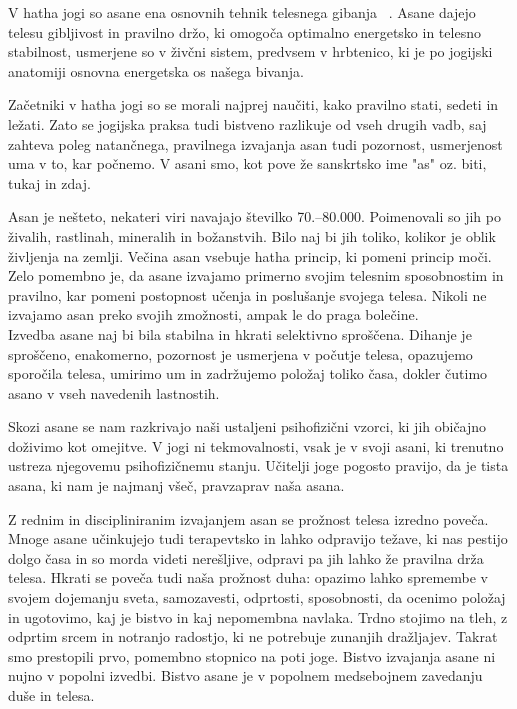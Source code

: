 \documentclass[a4paper, 12pt]{book}
\begin{document}
V hatha jogi so asane ena osnovnih tehnik telesnega gibanja  ~\cite{Asane}. Asane dajejo telesu gibljivost in pravilno držo, ki omogoča optimalno energetsko in telesno stabilnost, usmerjene so v živčni sistem, predvsem v hrbtenico, ki je po jogijski anatomiji osnovna energetska os našega bivanja.

Začetniki v hatha jogi so se morali najprej naučiti, kako pravilno stati, sedeti in ležati. Zato se jogijska praksa tudi bistveno razlikuje od vseh drugih vadb, saj zahteva poleg natančnega, pravilnega izvajanja asan tudi pozornost, usmerjenost uma v to, kar počnemo. V asani smo, kot pove že sanskrtsko ime "as" oz. biti, tukaj in zdaj.

Asan je nešteto, nekateri viri navajajo številko 70.–80.000. Poimenovali so jih po živalih, rastlinah, mineralih in  božanstvih. Bilo naj bi jih toliko, kolikor je oblik življenja na zemlji. Večina asan vsebuje hatha princip, ki pomeni princip moči. Zelo pomembno je, da asane izvajamo primerno svojim telesnim sposobnostim in pravilno, kar pomeni postopnost učenja in poslušanje svojega telesa. Nikoli ne izvajamo asan preko svojih zmožnosti, ampak le do praga bolečine. \\ 

Izvedba asane naj bi bila stabilna in hkrati selektivno sproščena. Dihanje je sproščeno, enakomerno, pozornost je usmerjena v počutje telesa, opazujemo sporočila telesa, umirimo um in zadržujemo položaj toliko časa, dokler čutimo asano v vseh navedenih lastnostih. 

Skozi asane se nam razkrivajo naši ustaljeni psihofizični vzorci, ki jih običajno doživimo kot omejitve. V jogi ni tekmovalnosti, vsak je v svoji asani, ki trenutno ustreza njegovemu psihofizičnemu stanju. Učitelji joge pogosto pravijo, da je tista asana, ki nam je najmanj všeč, pravzaprav naša asana.

Z rednim in discipliniranim izvajanjem asan se prožnost telesa izredno poveča. Mnoge asane učinkujejo tudi terapevtsko in lahko odpravijo težave, ki nas pestijo dolgo časa in so morda videti nerešljive, odpravi pa jih lahko že pravilna drža telesa. Hkrati se poveča tudi naša prožnost duha: opazimo lahko spremembe v svojem dojemanju sveta, samozavesti, odprtosti, sposobnosti, da ocenimo položaj in ugotovimo, kaj je bistvo in kaj nepomembna navlaka. Trdno stojimo na tleh, z odprtim srcem in notranjo radostjo, ki ne potrebuje zunanjih dražljajev. Takrat smo prestopili prvo, pomembno stopnico na poti joge.
Bistvo izvajanja asane ni nujno v popolni izvedbi. Bistvo asane je v popolnem medsebojnem zavedanju duše in telesa.
\end{document}
